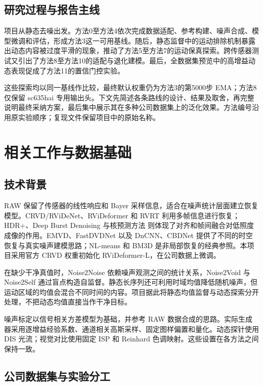 \documentclass[11pt,a4paper,UTF8,fontset=fandol]{ctexart}
\begin{document}
\subsection{研究过程与报告主线}

项目从静态去噪出发。方法0至方法4依次完成数据适配、参考构建、噪声合成、模型微调和评估，形成方法3这一可用基线。随后，静态监督中的运动排除机制暴露出动态内容被过度平滑的现象，推动了方法5至方法7的运动保真探索。跨传感器测试又引出了方法8至方法10的适配与退化建模。最后，全数据集预览中的高增益动态表现促成了方法11的置信门控实验。

这些探索均以同一基线作比较，最终默认权重仍为方法3的第5000步 EMA；方法8仅保留 sc635hai 专用输出头。下文先简述各条路线的设计、结果及取舍，再完整说明最终采纳方案，最后集中展示其在多种公司数据集上的泛化效果。方法编号沿用原实验顺序；复现文件保留项目中的原始名称。

\section{相关工作与数据基础}

\subsection{技术背景}

RAW 保留了传感器的线性响应和 Bayer 采样信息，适合在噪声统计层面建立恢复模型。CRVD/RViDeNet\cite{r1}、RViDeformer\cite{r2} 和 RVRT\cite{r3} 利用多帧信息进行恢复；HDR+\cite{r10}、Deep Burst Denoising\cite{r9} 与核预测方法\cite{r17} 则体现了对齐和帧间融合对低照度成像的作用。EMVD\cite{r15}、FastDVDNet\cite{r16} 以及 DnCNN\cite{r14}、CBDNet\cite{r20} 提供了不同的时空恢复与真实噪声建模思路；NL-means\cite{r18} 和 BM3D\cite{r19} 是非局部恢复的经典参照。本项目采用官方 CRVD 权重初始化 RViDeformer-L，在公司数据上微调。

在缺少干净真值时，Noise2Noise\cite{r4} 依赖噪声观测之间的统计关系，Noise2Void\cite{r5} 与 Noise2Self\cite{r6} 通过盲点构造自监督。静态长序列还可利用时域均值降低随机噪声，但运动区域的均值会混合不同时间的内容。项目据此将静态均值监督与动态探索分开处理，不把动态均值直接当作干净目标。

噪声标定以信号相关方差模型\cite{r7}为基础，并参考 RAW 数据合成的思路\cite{r8}。实际生成器采用逐增益经验系数、通道相关高斯采样、固定图样偏置和量化。动态探针使用 DIS 光流\cite{r11}；视觉对比使用固定 ISP 和 Reinhard 色调映射\cite{r12}。这些设置在各方法之间保持一致。

\subsection{公司数据集与实验分工}
\end{document}
